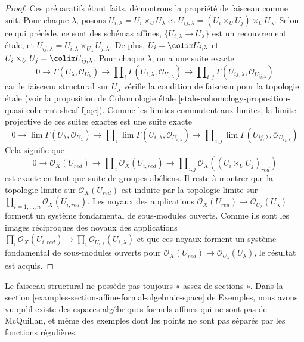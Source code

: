 \begin{proof}
\medskip\noindent
Ces préparatifs étant faits, démontrons la propriété de
faisceau comme suit. Pour chaque $\lambda$, posons
$U_{i, \lambda} = U_i \times_U U_\lambda$ et
$U_{ij, \lambda} = (U_i \times_U U_j) \times_U U_\lambda$.
Selon ce qui précède, ce sont des schémas affines, $\{U_{i, \lambda} \to U_\lambda\}$
est un recouvrement \'etale, et
$U_{ij, \lambda} = U_{i, \lambda} \times_{U_\lambda} U_{j, \lambda}$.
De plus, $U_i = \colim U_{i, \lambda}$ et
$U_i \times_U U_j = \colim U_{ij, \lambda}$.
Pour chaque $\lambda$, on a une suite exacte
$$
0 \to
\Gamma(U_\lambda, \mathcal{O}_{U_\lambda}) \to
\prod\nolimits_i \Gamma(U_{i, \lambda}, \mathcal{O}_{U_{i, \lambda}}) \to
\prod\nolimits_{i, j} \Gamma(U_{ij, \lambda}, \mathcal{O}_{U_{ij, \lambda}})
$$
car le faisceau structural sur $U_\lambda$ vérifie la condition de faisceau
pour la topologie \'etale
(voir la proposition de Cohomologie \'etale
\ref{etale-cohomology-proposition-quasi-coherent-sheaf-fpqc}).
Comme les limites commutent aux limites, la limite projective de ces
suites exactes est une suite exacte
$$
0 \to
\lim \Gamma(U_\lambda, \mathcal{O}_{U_\lambda}) \to
\prod\nolimits_i \lim \Gamma(U_{i, \lambda}, \mathcal{O}_{U_{i, \lambda}}) \to
\prod\nolimits_{i, j} \lim
\Gamma(U_{ij, \lambda}, \mathcal{O}_{U_{ij, \lambda}})
$$
Cela signifie que
$$
0 \to
\mathcal{O}_X(U_{red}) \to
\prod\nolimits_i \mathcal{O}_X(U_{i, red}) \to
\prod\nolimits_{i, j} \mathcal{O}_X((U_i \times_U U_j)_{red})
$$
est exacte en tant que suite de groupes abéliens. Il reste à
montrer que la topologie limite sur $\mathcal{O}_X(U_{red})$ est induite
par la topologie limite sur
$\prod_{i = 1, \ldots, n} \mathcal{O}_X(U_{i, red})$.
Les noyaux des applications
$\mathcal{O}_X(U_{red}) \to \mathcal{O}_{U_\lambda}(U_\lambda)$
forment un système fondamental de sous-modules ouverts. Comme ils sont les images
réciproques des noyaux des applications
$\prod_i \mathcal{O}_X(U_{i, red}) \to
\prod_i \mathcal{O}_{U_{i, \lambda}}(U_{i, \lambda})$
et que ces noyaux forment un système fondamental de sous-modules ouverts
pour $\mathcal{O}_X(U_{red}) \to \mathcal{O}_{U_\lambda}(U_\lambda)$,
le résultat est acquis.
\end{proof}

\begin{remark}
\label{remark-not-enough-sections}
Le faisceau structural ne possède pas toujours « assez de sections ».
Dans la section \ref{examples-section-affine-formal-algebraic-space} de Exemples,
nous avons vu qu'il existe des espaces algébriques formels affines qui
ne sont pas de McQuillan, et même des exemples dont les points ne sont pas
séparés par les fonctions régulières.
\end{remark}

